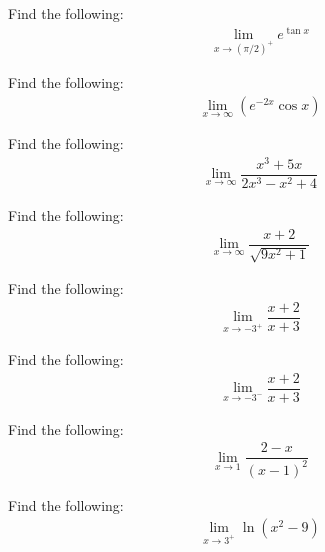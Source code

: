 \begin{exercise}
Find the following:
\begin{align*}
    \lim_{x \longrightarrow (\pi/2)^{+}} e^{\tan x}
\end{align*}
\end{exercise}

\begin{exercise}
Find the following:
\begin{align*}
    \lim_{x \longrightarrow \infty} (e^{-2x}\cos x)
\end{align*}
\end{exercise}

\begin{exercise}
Find the following:
\begin{align*}
    \lim_{x \longrightarrow \infty} \dfrac{x^{3} + 5x}{2x^{3} - x^{2} + 4}
\end{align*}
\end{exercise}

\begin{exercise}
Find the following:
\begin{align*}
    \lim_{x \longrightarrow \infty} \dfrac{x+2}{\sqrt{9x^{2}+1}}
\end{align*}
\end{exercise}

\begin{exercise}
Find the following:
\begin{align*}
    \lim_{x \longrightarrow -3^{+}} \dfrac{x+2}{x+3}
\end{align*}
\end{exercise}

\begin{exercise}
Find the following:
\begin{align*}
    \lim_{x \longrightarrow -3^{-}} \dfrac{x+2}{x+3}
\end{align*}
\end{exercise}

\begin{exercise}
Find the following:
\begin{align*}
    \lim_{x \longrightarrow 1} \dfrac{2-x}{(x-1)^{2}}
\end{align*}
\end{exercise}

\begin{exercise}
Find the following:
\begin{align*}
    \lim_{x \longrightarrow 3^{+}} \ln(x^{2} - 9)
\end{align*}
\end{exercise}

